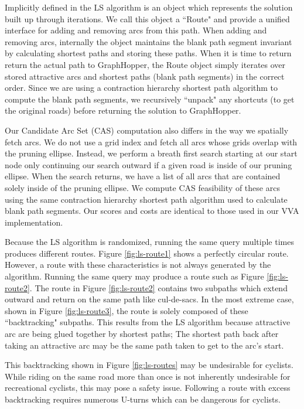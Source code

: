 \documentclass[11pt]{article}
\begin{document}
Implicitly defined in the LS algorithm is an object which represents the solution built up through iterations. We call this object a ``Route" and provide a unified interface for adding and removing arcs from this path. When adding and removing arcs, internally the object maintains the blank path segment invariant by calculating shortest paths and storing these paths. When it is time to return return the actual path to GraphHopper, the Route object simply iterates over stored attractive arcs and shortest paths (blank path segments) in the correct order. Since we are using a contraction hierarchy shortest path algorithm to compute the blank path segments, we recursively ``unpack" any shortcuts (to get the original roads) before returning the solution to GraphHopper. 

Our Candidate Arc Set (CAS) computation also differs in the way we spatially fetch arcs. We do not use a grid index and fetch all arcs whose grids overlap with the pruning ellipse.  Instead, we perform a breath first search starting at our start node only continuing our search outward if a given road is inside of our pruning ellipse. When the search returns, we have a list of all arcs that are contained solely inside of the pruning ellipse. We compute CAS feasibility of these arcs using the same contraction hierarchy shortest path algorithm used to calculate blank path segments. Our scores and costs are identical to those used in our VVA implementation.

Because the LS algorithm is randomized, running the same query multiple times produces different routes. Figure \ref{fig:ls-route1} shows a perfectly circular route. However, a route with these characteristics is not always generated by the algorithm. Running the same query may produce a route such as Figure \ref{fig:ls-route2}. The route in Figure \ref{fig:ls-route2} contains two subpaths which extend outward and return on the same path like cul-de-sacs. In the most extreme case, shown in Figure \ref{fig:ls-route3}, the route is solely composed of these ``backtracking" subpaths. This results from the LS algorithm because attractive arc are being glued together by shortest paths; The shortest path back after taking an attractive arc may be the same path taken to get to the arc's start.

This backtracking shown in Figure \ref{fig:ls-routes} may be undesirable for cyclists. While riding on the same road more than once is not inherently undesirable for recreational cyclists, this may pose a safety issue. Following a route with excess backtracking requires numerous U-turns which can be dangerous for cyclists.  
\end{document}

